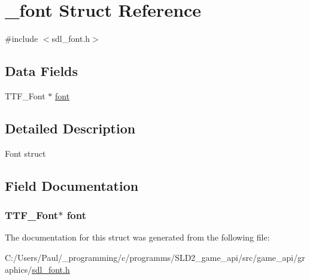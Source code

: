 \hypertarget{struct__font}{\section{\+\_\+font Struct Reference}
\label{struct__font}
}


{\ttfamily \#include $<$sdl\+\_\+font.\+h$>$}

\subsection*{Data Fields}
\begin{DoxyCompactItemize}
\item 
T\+T\+F\+\_\+\+Font $\ast$ \hyperlink{struct__font_abf5bfa705e66ffc1ddaa6ce46c960873}{font}
\end{DoxyCompactItemize}


\subsection{Detailed Description}
Font struct 

\subsection{Field Documentation}
\hypertarget{struct__font_abf5bfa705e66ffc1ddaa6ce46c960873}{
\subsubsection[{font}]{\setlength{\rightskip}{0pt plus 5cm}T\+T\+F\+\_\+\+Font$\ast$ font}}\label{struct__font_abf5bfa705e66ffc1ddaa6ce46c960873}


The documentation for this struct was generated from the following file\+:\begin{DoxyCompactItemize}
\item 
C\+:/\+Users/\+Paul/\+\_\+programming/c/programms/\+S\+L\+D2\+\_\+game\+\_\+api/src/game\+\_\+api/graphics/\hyperlink{sdl__font_8h}{sdl\+\_\+font.\+h}\end{DoxyCompactItemize}

